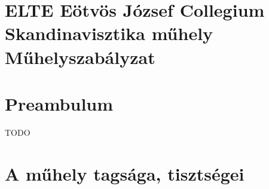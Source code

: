 \documentclass{../styles/rulebook}
\begin{document}
\section*{ELTE Eötvös József Collegium \\ Skandinavisztika műhely\\ \vspace{0.5em} Műhelyszabályzat} 

\vspace{2em}

\section*{Preambulum}
TODO


\section{A műhely tagsága, tisztségei}
\end{document}
